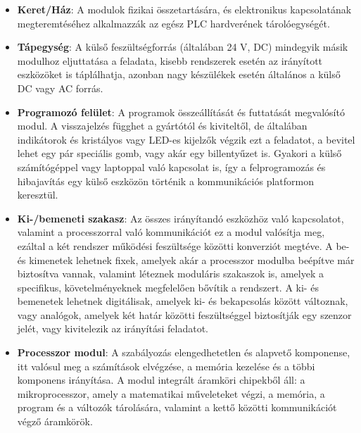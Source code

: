 \begin{itemize}
	\item \textbf{Keret/Ház}: A modulok fizikai összetartására, és elektronikus kapcsolatának megteremtéséhez alkalmazzák az egész PLC hardverének tárolóegységét.
	\item \textbf{Tápegység}: A külső feszültségforrás (általában 24 V, DC) mindegyik másik modulhoz eljuttatása a feladata, kisebb rendszerek esetén az irányított eszközöket is táplálhatja, azonban nagy készülékek esetén általános a külső DC vagy AC forrás.
	\item \textbf{Programozó felület}: A programok összeállítását és futtatását megvalósító modul. A visszajelzés függhet a gyártótól és kiviteltől, de általában indikátorok és kristályos vagy LED-es kijelzők végzik ezt a feladatot, a bevitel lehet egy pár speciális gomb, vagy akár egy billentyűzet is. Gyakori a külső számítógéppel vagy laptoppal való kapcsolat is, így a felprogramozás és hibajavítás egy külső eszközön történik a kommunikációs platformon keresztül.
	\item \textbf{Ki-/bemeneti szakasz}: Az összes irányítandó eszközhöz való kapcsolatot, valamint a processzorral való kommunikációt ez a modul valósítja meg, ezáltal a két rendszer működési feszültsége közötti konverziót megtéve. A be- és kimenetek lehetnek fixek, amelyek akár a processzor modulba beépítve már biztosítva vannak, valamint léteznek moduláris szakaszok is, amelyek a specifikus, követelményeknek megfelelően bővítik a rendszert. A ki- és bemenetek lehetnek digitálisak, amelyek ki- és bekapcsolás között változnak, vagy analógok, amelyek két határ közötti feszültséggel biztosítják egy szenzor jelét, vagy kivitelezik az irányítási feladatot.
	\item \textbf{Processzor modul}: A szabályozás elengedhetetlen és alapvető komponense, itt valósul meg a számítások elvégzése, a memória kezelése és a többi komponens irányítása. A modul integrált áramköri chipekből áll: a mikroprocesszor, amely a matematikai műveleteket végzi, a memória, a program és a változók tárolására, valamint a kettő közötti kommunikációt végző áramkörök.
\end{itemize}
